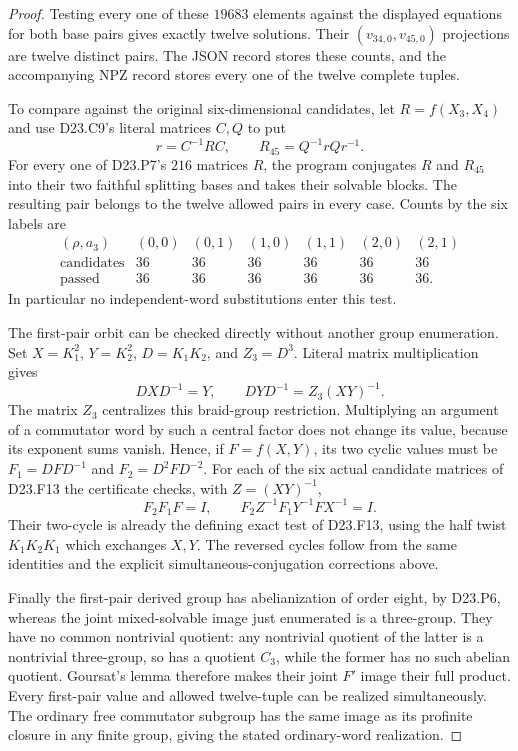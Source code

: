 \begin{proof}
Testing every one of these $19683$ elements against the displayed
equations for both base pairs gives exactly twelve solutions.  Their
$(v_{34,0},v_{45,0})$ projections are twelve distinct pairs.  The
JSON record stores these counts, and the accompanying NPZ record
stores every one of the twelve complete tuples.

To compare against the original six-dimensional candidates, let
$R=f(X_3,X_4)$ and use D23.C9's literal matrices $C,Q$ to put
\[
 r=C^{-1}RC,\qquad R_{45}=Q^{-1}rQr^{-1}.
\tag{D23.F24.5}
\]
For every one of D23.P7's $216$ matrices $R$, the program conjugates
$R$ and $R_{45}$ into their two faithful splitting bases and takes
their solvable blocks.  The resulting pair belongs to the twelve
allowed pairs in every case.  Counts by the six labels are
\[
\begin{array}{c|rrrrrr}
 (\rho,a_3)&(0,0)&(0,1)&(1,0)&(1,1)&(2,0)&(2,1)\\ \hline
 \text{candidates}&36&36&36&36&36&36\\
 \text{passed}&36&36&36&36&36&36.
\end{array}
\tag{D23.F24.6}
\]
In particular no independent-word substitutions enter this test.

The first-pair orbit can be checked directly without another group
enumeration.  Set $X=K_1^2$, $Y=K_2^2$,
$D=K_1K_2$, and $Z_3=D^3$.  Literal matrix multiplication gives
\[
 DXD^{-1}=Y,\qquad DYD^{-1}=Z_3(XY)^{-1}.
\tag{D23.F24.7}
\]
The matrix $Z_3$ centralizes this braid-group restriction.
Multiplying an argument of a commutator word by such a central
factor does not change its value, because its exponent sums vanish.
Hence, if $F=f(X,Y)$, its two cyclic values must be
$F_1=DFD^{-1}$ and $F_2=D^2FD^{-2}$.
For each of the six actual candidate matrices of D23.F13 the
certificate checks, with $Z=(XY)^{-1}$,
\[
       F_2F_1F=I,\qquad
       F_2Z^{-1}F_1Y^{-1}FX^{-1}=I.
\tag{D23.F24.8}
\]
Their two-cycle is already the defining exact test of D23.F13,
using the half twist $K_1K_2K_1$ which exchanges $X,Y$.
The reversed cycles follow from the same identities and the
explicit simultaneous-conjugation corrections above.

Finally the first-pair derived group has abelianization of order
eight, by D23.P6, whereas the joint mixed-solvable image just
enumerated is a three-group.  They have no common nontrivial
quotient: any nontrivial quotient of the latter is a nontrivial
three-group, so has a quotient $C_3$, while the former has no such
abelian quotient.  Goursat's lemma therefore makes their joint
$F'$ image their full product.  Every first-pair value and allowed
twelve-tuple can be realized simultaneously.  The ordinary free
commutator subgroup has the same image as its profinite closure
in any finite group, giving the stated ordinary-word realization.


\end{proof}
